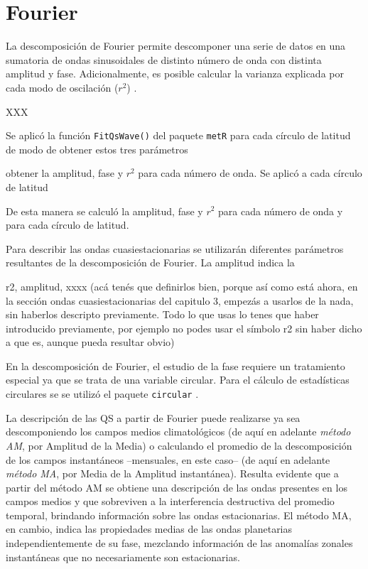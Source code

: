 \documentclass[spanish,a4paper,12pt,oneside]{book}
\begin{document}
\section*{Fourier}

La descomposición de Fourier permite descomponer una serie de datos en
una sumatoria de ondas sinusoidales de distinto número de onda con
distinta amplitud y fase. Adicionalmente, es posible calcular la
varianza explicada por cada modo de oscilación (\(r^2\))
\autocite{Wilks2011}.

XXX

Se aplicó la función \texttt{FitQsWave()} del paquete \texttt{metR}
\autocite{R-metR} para cada círculo de latitud de modo de obtener estos
tres parámetros

obtener la amplitud, fase y \(r^2\) para cada número de onda. Se aplicó
a cada círculo de latitud

De esta manera se calculó la amplitud, fase y \(r^2\) para cada número
de onda y para cada círculo de latitud.

Para describir las ondas cuasiestacionarias se utilizarán diferentes
parámetros resultantes de la descomposición de Fourier. La amplitud
indica la

r2, amplitud, xxxx (acá tenés que definirlos bien, porque así como está
ahora, en la sección ondas cuasiestacionarias del capitulo 3, empezás a
usarlos de la nada, sin haberlos descripto previamente. Todo lo que usas
lo tenes que haber introducido previamente, por ejemplo no podes usar el
símbolo r2 sin haber dicho a que es, aunque pueda resultar obvio)

En la descomposición de Fourier, el estudio de la fase requiere un
tratamiento especial ya que se trata de una variable circular. Para el
cálculo de estadísticas circulares se se utilizó el paquete
\texttt{circular} \autocite{R-circular}.

La descripción de las QS a partir de Fourier puede realizarse ya sea
descomponiendo los campos medios climatológicos (de aquí en adelante
\emph{método AM}, por Amplitud de la Media) o calculando el promedio de
la descomposición de los campos instantáneos --mensuales, en este caso--
(de aquí en adelante \emph{método MA}, por Media de la Amplitud
instantánea). Resulta evidente que a partir del método AM se obtiene una
descripción de las ondas presentes en los campos medios y que sobreviven
a la interferencia destructiva del promedio temporal, brindando
información sobre las ondas estacionarias. El método MA, en cambio,
indica las propiedades medias de las ondas planetarias
independientemente de su fase, mezclando información de las anomalías
zonales instantáneas que no necesariamente son estacionarias.
\end{document}
